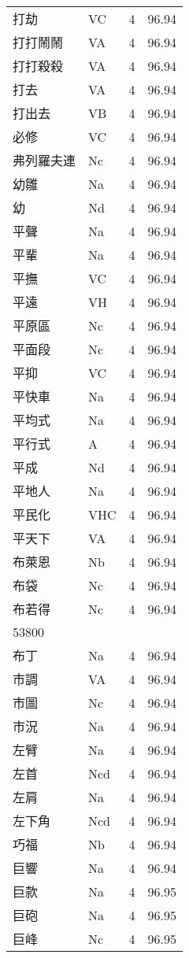 \documentclass[twocolumn]{book}
\begin{document}
\begin{supertabular}{llrr}
打劫 & VC & 4 &  96.94\\
打打鬧鬧 & VA & 4 &  96.94\\
打打殺殺 & VA & 4 &  96.94\\
打去 & VA & 4 &  96.94\\
打出去 & VB & 4 &  96.94\\
必修 & VC & 4 &  96.94\\
弗列羅夫連 & Nc & 4 &  96.94\\
幼雛 & Na & 4 &  96.94\\
幼 & Nd & 4 &  96.94\\
平聲 & Na & 4 &  96.94\\
平輩 & Na & 4 &  96.94\\
平撫 & VC & 4 &  96.94\\
平遠 & VH & 4 &  96.94\\
平原區 & Nc & 4 &  96.94\\
平面段 & Nc & 4 &  96.94\\
平抑 & VC & 4 &  96.94\\
平快車 & Na & 4 &  96.94\\
平均式 & Na & 4 &  96.94\\
平行式 & A & 4 &  96.94\\
平成 & Nd & 4 &  96.94\\
平地人 & Na & 4 &  96.94\\
平民化 & VHC & 4 &  96.94\\
平天下 & VA & 4 &  96.94\\
布萊恩 & Nb & 4 &  96.94\\
布袋 & Nc & 4 &  96.94\\
布若得 & Nc & 4 &  96.94\\
53800\\
布丁 & Na & 4 &  96.94\\
市調 & VA & 4 &  96.94\\
市圖 & Nc & 4 &  96.94\\
市況 & Na & 4 &  96.94\\
左臂 & Na & 4 &  96.94\\
左首 & Ncd & 4 &  96.94\\
左肩 & Na & 4 &  96.94\\
左下角 & Ncd & 4 &  96.94\\
巧福 & Nb & 4 &  96.94\\
巨響 & Na & 4 &  96.94\\
巨款 & Na & 4 &  96.95\\
巨砲 & Na & 4 &  96.95\\
巨峰 & Nc & 4 &  96.95\\

\end{supertabular}
\end{document}
